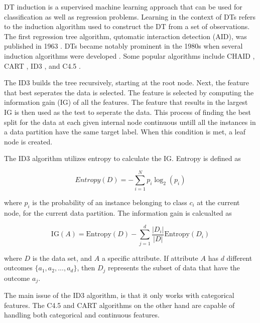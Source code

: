 \documentclass[conference]{IEEEtran}
\begin{document}
        DT induction is a supervised machine learning approach that can be used for classification as well as regression problems.
        Learning in the context of DTs refers to the induction algorithm used to construct the DT from a set of observations.
        The first regression tree algorithm, qutomatic interaction detection (AID), was published in 1963 \cite{DT_Morgan1963ProblemsIT}.
        DTs became notably prominent in the 1980s when several induction algorithms were developed \cite{DT_Kotsiantis2013}. Some popular
        algorithms include  CHAID \cite{DT_Kass1980}, CART \cite{DT_breiman1984classification}, ID3 \cite{DT_quinlan1986}, and C4.5 \cite{DT_quinlan1993}.
        
        The ID3 \cite{DT_quinlan1986} builds the tree recursively, starting at the root node. Next, the feature that best
        seperates the data is selected. The feature is selected by computing the information gain (IG) of all the features.
        The feature that results in the largest IG is then used as the test to seperate the data.
        This process of finding the best split for the data at each given internal node continuous untill all the instances
        in a data partition have the same target label. When this condition is met, a leaf node is created.

        The ID3 algorithm utilizes entropy to calculate the IG. Entropy is defined as

        \begin{equation}
            Entropy(D) = - \sum_{i=1}^{N} p_i \log_2(p_i)
        \end{equation}
                
        where $p_{i}$ is the probability of an instance belonging to class $c_{i}$ at the current node, for the current
        data partition. The information gain is calcualted as

        \begin{equation}
            \text{IG}(A) = \text{Entropy}(D) - \sum_{j=1}^{d} \frac{|D_i|}{|D|} \text{Entropy}(D_i)
        \end{equation}
            
        where $D$ is the data set, and $A$ a specific attribute. If attribute $A$ has $d$ different outcomes
        $\{a_1, a_2, ..., a_d\}$, then $D_j$ represents the subset of data that have the outcome $a_j$.

        The main issue of the ID3 algorithm, is that it only works with categorical features. The C4.5 \cite{DT_quinlan1993}
        and CART \cite{DT_breiman1984classification} algorithms on the other hand are capable of handling both categorical and
        continuous features.
\end{document}

